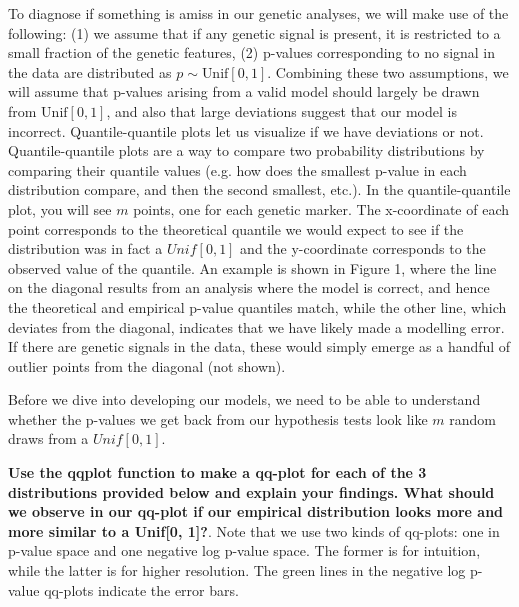 \documentclass[preview]{standalone}
\begin{document}
\begin{Parts}
	
	\Part To diagnose if something is amiss in our genetic analyses, we will make use of the following: (1) we assume that if any genetic signal is present, it is restricted to a small fraction of the genetic features, (2) p-values corresponding to no signal in the data are distributed as $p \sim \text{Unif}[0,1]$. Combining these two assumptions, we will assume that p-values arising from a valid model should largely be drawn from $\text{Unif}[0,1]$, and also that large deviations suggest that our model is incorrect.
	Quantile-quantile plots let us visualize if we have deviations or not. Quantile-quantile plots are a way to compare two probability distributions by comparing their quantile values (e.g. how does the smallest p-value in each distribution compare, and then the second smallest, etc.). In the quantile-quantile plot, you will see $m$ points, one for each genetic marker. The x-coordinate of each point corresponds to the theoretical quantile we would expect to see if the distribution was in fact a $Unif[0, 1]$ and the y-coordinate corresponds to the observed value of the quantile. An example is shown in Figure 1, where the line on the diagonal results from an analysis where the model is correct, and hence the theoretical and empirical p-value quantiles match, while the other line, which deviates from the diagonal, indicates that we have likely made a modelling error. If there are genetic signals in the data, these would simply emerge as a handful of outlier points from the diagonal (not shown).
	
	Before we dive into developing our models, we need to be able to understand whether the p-values we get back from our hypothesis tests look like $m$ random draws from a $Unif[0, 1]$.
	
	\textbf{Use the qqplot function to make a qq-plot for each of the 3 distributions provided below and explain your findings. What should we observe in our qq-plot if our empirical distribution looks more and more similar to a Unif[0, 1]?}. Note that we use two kinds of qq-plots: one in p-value space and one negative log p-value space. The former is for intuition, while the latter is for higher resolution. The green lines in the negative log p-value qq-plots indicate the error bars.
	
	
	

\end{Parts}
\end{document}
